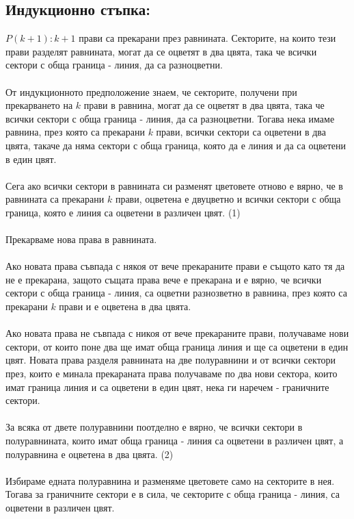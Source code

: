 \documentclass[10pt]{article}
\begin{document}
	\subsection*{Индукционно стъпка:}
	\(P(k + 1): k + 1\) прави са прекарани през равнината. Секторите, на които тези прави разделят равнината,
	могат да се оцветят в два цвята, така че всички сектори с обща граница - линия, да са разноцветни. \\\\
	От индукционното предположение знаем, че секторите, получени при прекарването на \(k\) прави в равнина,
	могат да се оцветят в два цвята, така че всички сектори с обща граница - линия, да са разноцветни.
	Тогава нека имаме равнина, през която са прекарани \(k\) прави, всички сектори са оцветени в два цвята, такаче да
	няма сектори с обща граница, която да е линия и да са оцветени в един цвят. \\\\
	Сега ако всички сектори в равнината си разменят цветовете отново е вярно, че
	в равнината са прекарани \(k\) прави, оцветена е двуцветно и всички сектори с обща граница,
	която е линия са оцветени в различен цвят. (1) \\\\
	Прекарваме нова права в равнината. \\\\
	Ако новата права съвпада с някоя от вече прекараните прави е същото като тя да не е прекарана,
	защото същата права вече е прекарана и е вярно, че всички сектори с обща граница - линия,
	са оцветни разнозветно в равнина, през която са прекарани \(k\) прави и е оцветена в два цвята. \\\\
	Ако новата права не съвпада с никоя от вече прекараните прави, получаваме нови сектори,
	от които поне два ще имат обща граница линия и ще са оцветени в един цвят.
	Новата права разделя равнината на две полуравнини и от всички сектори през,
	които е минала прекараната права получаваме по два нови сектора,
	които имат граница линия и са оцветени в един цвят, нека ги наречем - граничните сектори. \\\\
	За всяка от двете полуравнини поотделно е вярно, че всички сектори в полуравнината,
	които имат обща граница - линия са оцветени в различен цвят, а полуравнина е оцветена в два цвята. (2) \\\\
	Избираме едната полуравнина и разменяме цветовете само на секторите в нея.
	Тогава за граничните сектори е в сила, че секторите с обща граница - линия, са оцветени в различен цвят. \\\\
\end{document}
